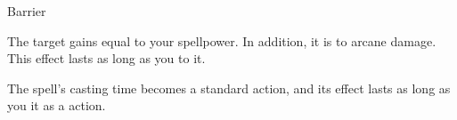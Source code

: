 \begin{spellsection}{Barrier}
\begin{spellheader}
\end{spellheader}
\begin{spellcontent}
\begin{spelltargetinginfo}
\end{spelltargetinginfo}
\begin{spelleffects}
\spelleffect
The target gains  equal to your spellpower.
In addition, it is  to arcane damage.
This effect lasts as long as you  to it.
\end{spelleffects}
\end{spellcontent}
\begin{spellfooter}
\end{spellfooter}
\begin{spellsubcontent}
\begin{spellcantrip}
The spell's casting time becomes a standard action, and its effect lasts as long as you  it as a  action.
\end{spellcantrip}
\end{spellsubcontent}
\end{spellsection}
